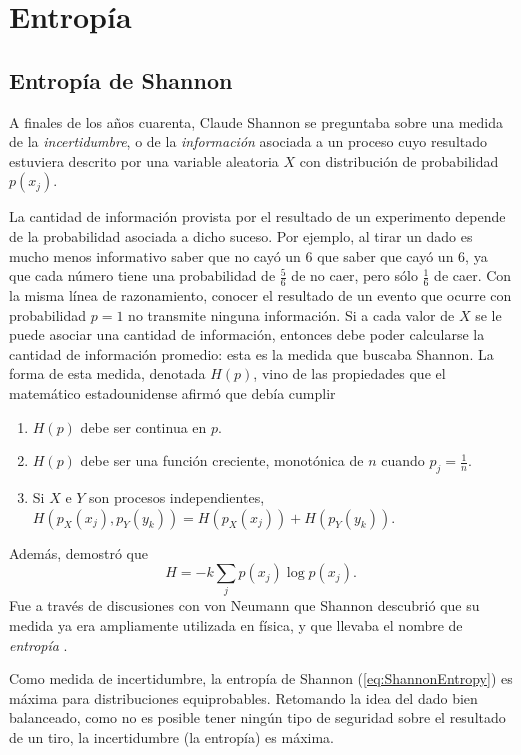 \section{Entropía}
\subsection{Entropía de Shannon}
A finales de los años cuarenta, Claude Shannon se preguntaba sobre una medida de la \textit{incertidumbre}, o de la \textit{información} asociada a un proceso cuyo resultado estuviera descrito por una variable aleatoria $X$ con distribución de probabilidad $p(x_{j})$.


La cantidad de información provista por el resultado de un experimento depende de la probabilidad asociada a dicho suceso. Por ejemplo, al tirar un dado es mucho menos informativo saber que no cayó un $6$ que saber que cayó un $6$, ya que cada número tiene una probabilidad de $\frac{5}{6}$ de no caer, pero sólo $\frac{1}{6}$ de caer. Con la misma línea de razonamiento, conocer el resultado de un evento que ocurre con probabilidad $p=1$ no transmite ninguna información. Si a cada valor de $X$ se le puede asociar una cantidad de información, entonces debe poder calcularse la cantidad de información promedio: esta es la medida que buscaba Shannon. La forma de esta medida, denotada $H(p)$, vino de las propiedades que el matemático estadounidense afirmó que debía cumplir \cite{Shannon,Wilde}
\begin{enumerate}
    \item $H(p)$ debe ser continua en $p$.
    \item $H(p)$ debe ser una función creciente, monotónica de $n$ cuando $p_{j}=\frac{1}{n}$.
    \item Si $X$ e $Y$ son procesos independientes, $H(p_{X}(x_{j}),p_{Y}(y_{k}))=H(p_{X}(x_{j}))+H(p_{Y}(y_{k}))$.
\end{enumerate}
Además, demostró que
\begin{equation}\label{eq:ShannonEntropy}
    H=-k\sum_{j}p(x_{j})\log{p(x_{j})}.
\end{equation}
Fue a través de discusiones con von Neumann que Shannon descubrió que su medida ya era ampliamente utilizada en física, y que llevaba el nombre de \textit{entropía} \cite{McIrvine}.

Como medida de incertidumbre, la entropía de Shannon (\ref{eq:ShannonEntropy}) es máxima para distribuciones equiprobables. Retomando la idea del dado bien balanceado, como no es posible tener ningún tipo de seguridad sobre el resultado de un tiro, la incertidumbre (la entropía) es máxima.

